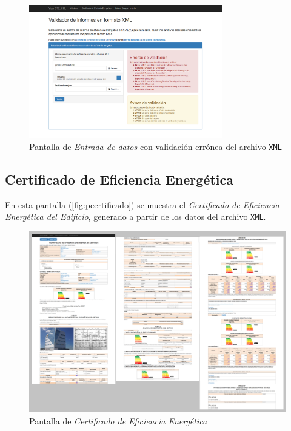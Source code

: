 \documentclass[10pt,notitlepage,oneside,a4paper]{article}
\begin{document}
\begin{figure}[H]
  \centering
  \includegraphics[width=0.75\textwidth]{imagenes/pantalla_entradadatos_validaerror}  
  \caption{Pantalla de \textit{Entrada de datos} con validación errónea del archivo \texttt{XML}}
  \label{fig:pvalidaerror}
\end{figure}

\subsection{Certificado de Eficiencia Energética}

En esta pantalla (\autoref{fig:pcertificado}) se muestra el \textit{Certificado de Eficiencia Energética del Edificio}, generado a partir de los datos del archivo \texttt{XML}.

\begin{figure}[H]
  \centering
  \includegraphics[width=\textwidth]{imagenes/pantalla_certificado_trozos}  
  \caption{Pantalla de \textit{Certificado de Eficiencia Energética}}
  \label{fig:pcertificado}
\end{figure}
\end{document}
